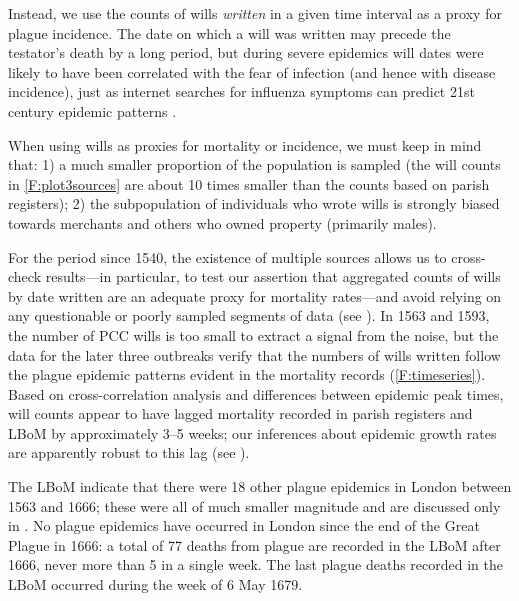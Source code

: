 \begin{description}
Instead, we use the counts of wills \emph{written} in a given time interval
as a proxy for plague incidence. The date on which a will was written may precede the testator's death by a long period, but during severe epidemics will dates were likely to have been correlated with the fear of infection (and hence with disease incidence), just as internet searches for influenza symptoms can predict 21st century epidemic patterns \cite{Gins+09}.

When using wills as proxies for mortality or incidence, we must keep in mind that: 1) a much smaller proportion of the population is sampled (the will counts in \cref{F:plot3sources} are about 10 times smaller than the counts based on parish registers); 2) the subpopulation of individuals who wrote wills is strongly biased towards merchants and others who owned property (primarily males).
\end{description}

For the period since 1540, the existence of multiple sources allows us to cross-check results---in particular, to test our assertion that aggregated counts of wills by date written are an adequate proxy for mortality rates---and avoid relying on any questionable or poorly sampled segments of data \cite{RoosCurt18} (see \supp). In 1563 and 1593, the number of PCC wills is too small to extract a signal from the noise, but the data for the later three outbreaks verify that the numbers of wills written follow the plague epidemic patterns evident in the mortality records (\cref{F:timeseries}). Based on cross-correlation analysis and differences between epidemic peak times, will counts appear to have lagged mortality recorded in parish registers and LBoM by approximately 3--5 weeks; our inferences about epidemic growth rates are apparently robust to this lag (see \supp). 

The LBoM indicate that there were 18 other plague epidemics in London between 1563 and 1666; these were all of much smaller magnitude and are discussed only in \supp.  No plague epidemics have occurred in London since the end of the Great Plague in 1666: a total of 77 deaths from plague are recorded in the LBoM after 1666, never more than 5 in a single week.  The last plague deaths recorded in the LBoM occurred during the week of 6 May 1679.

